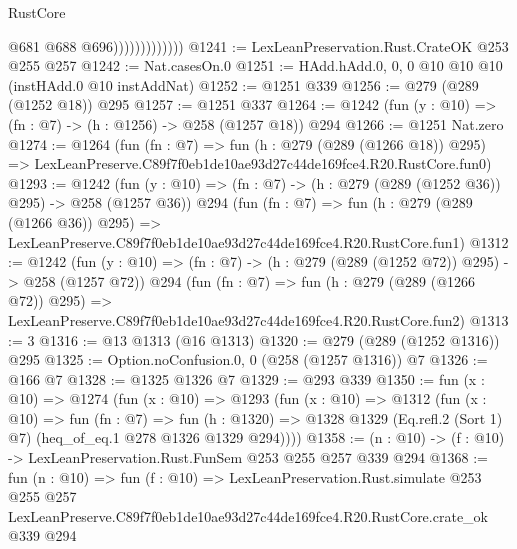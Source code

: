 \begin{lexlean}{RustCore}
\begin{coremodule}
                              @681
                              @688
                              @696)))))))))))))
@1241 := LexLeanPreservation.Rust.CrateOK @253 @255 @257
@1242 := Nat.casesOn.{0}
@1251 := HAdd.hAdd.{0, 0, 0} @10 @10 @10 (instHAdd.{0} @10 instAddNat)
@1252 := @1251 @339
@1256 := @279 (@289 (@1252 @18)) @295
@1257 := @1251 @337
@1264 := @1242 (fun (y : @10) => (fn : @7) -> (h : @1256) -> @258 (@1257 @18)) @294
@1266 := @1251 Nat.zero
@1274 := @1264
    (fun (fn : @7) =>
    fun (h : @279 (@289 (@1266 @18)) @295) =>
    LexLeanPreserve.C89f7f0eb1de10ae93d27c44de169fce4.R20.RustCore.fun0)
@1293 := @1242
    (fun (y : @10) => (fn : @7) -> (h : @279 (@289 (@1252 @36)) @295) -> @258 (@1257 @36))
    @294
    (fun (fn : @7) =>
    fun (h : @279 (@289 (@1266 @36)) @295) =>
    LexLeanPreserve.C89f7f0eb1de10ae93d27c44de169fce4.R20.RustCore.fun1)
@1312 := @1242
    (fun (y : @10) => (fn : @7) -> (h : @279 (@289 (@1252 @72)) @295) -> @258 (@1257 @72))
    @294
    (fun (fn : @7) =>
    fun (h : @279 (@289 (@1266 @72)) @295) =>
    LexLeanPreserve.C89f7f0eb1de10ae93d27c44de169fce4.R20.RustCore.fun2)
@1313 := 3
@1316 := @13 @1313 (@16 @1313)
@1320 := @279 (@289 (@1252 @1316)) @295
@1325 := Option.noConfusion.{0, 0} (@258 (@1257 @1316)) @7
@1326 := @166 @7
@1328 := @1325 @1326 @7
@1329 := @293 @339
@1350 := fun (x : @10) =>
  @1274
    (fun (x : @10) =>
    @1293
      (fun (x : @10) =>
      @1312
        (fun (x : @10) =>
        fun (fn : @7) =>
        fun (h : @1320) =>
        @1328 @1329 (Eq.refl.{2} (Sort 1) @7) (heq_of_eq.{1} @278 @1326 @1329 @294))))
@1358 := (n : @10) -> (f : @10) -> LexLeanPreservation.Rust.FunSem @253 @255 @257 @339 @294
@1368 := fun (n : @10) =>
  fun (f : @10) =>
  LexLeanPreservation.Rust.simulate
    @253
    @255
    @257
    LexLeanPreserve.C89f7f0eb1de10ae93d27c44de169fce4.R20.RustCore.crate_ok
    @339
    @294
\end{coremodule}
\end{lexlean}
